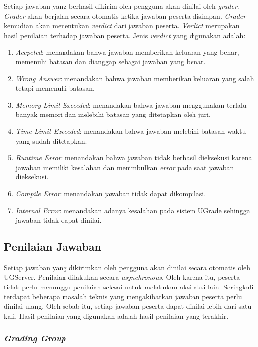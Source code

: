 \par Setiap jawaban yang berhasil dikirim oleh pengguna akan dinilai oleh \textit{grader}. \textit{Grader} akan berjalan secara otomatis ketika jawaban peserta disimpan. \textit{Grader} kemudian akan menentukan \textit{verdict} dari jawaban peserta. \textit{Verdict} merupakan hasil penilaian terhadap jawaban peserta. Jenis \textit{verdict} yang digunakan adalah:
\begin{enumerate}
    \item \textit{Accpeted}: menandakan bahwa jawaban memberikan keluaran yang benar, memenuhi batasan dan dianggap sebagai jawaban yang benar.
    \item \textit{Wrong Answer}: menandakan bahwa jawaban memberikan keluaran yang salah tetapi memenuhi batasan.
    \item \textit{Memory Limit Exceeded}: menandakan bahwa jawaban menggunakan terlalu banyak memori dan melebihi batasan yang ditetapkan oleh juri.
    \item \textit{Time Limit Exceeded}: menandakan bahwa jawaban melebihi batasan waktu yang sudah ditetapkan.
    \item \textit{Runtime Error}: menandakan bahwa jawaban tidak berhasil dieksekusi karena jawaban memiliki kesalahan dan menimbulkan \textit{error} pada saat jawaban dieksekusi.
    \item \textit{Compile Error}: menandakan jawaban tidak dapat dikompilasi.
    \item \textit{Internal Error}: menandakan adanya kesalahan pada sistem UGrade sehingga jawaban tidak dapat dinilai.
\end{enumerate}

\subsection{Penilaian Jawaban}

\par Setiap jawaban yang dikirimkan oleh pengguna akan dinilai secara otomatis oleh UGServer. Penilaian dilakukan secara \textit{asynchronous}. Oleh karena itu, peserta tidak perlu menunggu penilaian selesai untuk melakukan aksi-aksi lain. Seringkali terdapat beberapa masalah teknis yang mengakibatkan jawaban peserta perlu dinilai ulang. Oleh sebab itu, setiap jawaban peserta dapat dinilai lebih dari satu kali. Hasil penilaian yang digunakan adalah hasil penilaian yang terakhir.

\subsubsection{\textit{Grading Group}}


